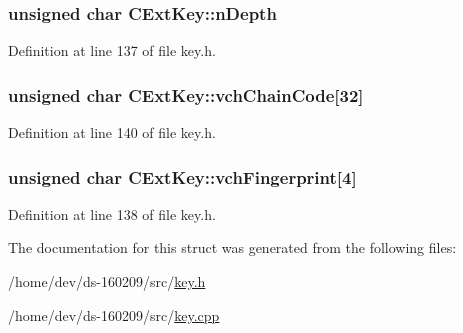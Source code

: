 \hypertarget{struct_c_ext_key_ab197a253f41646975405b4ead8027b55}{}
\subsubsection[{n\+Depth}]{\setlength{\rightskip}{0pt plus 5cm}unsigned char C\+Ext\+Key\+::n\+Depth}\label{struct_c_ext_key_ab197a253f41646975405b4ead8027b55}


Definition at line 137 of file key.\+h.

\hypertarget{struct_c_ext_key_a637ce75955e2883d20172b707c26a459}{}
\subsubsection[{vch\+Chain\+Code}]{\setlength{\rightskip}{0pt plus 5cm}unsigned char C\+Ext\+Key\+::vch\+Chain\+Code\mbox{[}32\mbox{]}}\label{struct_c_ext_key_a637ce75955e2883d20172b707c26a459}


Definition at line 140 of file key.\+h.

\hypertarget{struct_c_ext_key_a22efb3f5dfb26cd8d88d2ab5db885978}{}
\subsubsection[{vch\+Fingerprint}]{\setlength{\rightskip}{0pt plus 5cm}unsigned char C\+Ext\+Key\+::vch\+Fingerprint\mbox{[}4\mbox{]}}\label{struct_c_ext_key_a22efb3f5dfb26cd8d88d2ab5db885978}


Definition at line 138 of file key.\+h.



The documentation for this struct was generated from the following files\+:\begin{DoxyCompactItemize}
\item 
/home/dev/ds-\/160209/src/\hyperlink{key_8h}{key.\+h}\item 
/home/dev/ds-\/160209/src/\hyperlink{key_8cpp}{key.\+cpp}\end{DoxyCompactItemize}
